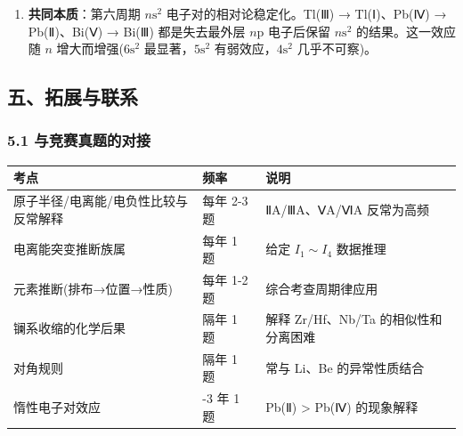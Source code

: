 \begin{enumerate}
\def\labelenumi{(\arabic{enumi})}
\setcounter{enumi}{2}
\tightlist
\item
  \textbf{共同本质}：第六周期 \(n\mathrm{s}^2\) 电子对的相对论稳定化。Tl(Ⅲ) → Tl(Ⅰ)、Pb(Ⅳ) → Pb(Ⅱ)、Bi(Ⅴ) → Bi(Ⅲ) 都是失去最外层 \(n\mathrm{p}\) 电子后保留 \(n\mathrm{s}^2\) 的结果。这一效应随 \(n\) 增大而增强(\(6\mathrm{s}^2\) 最显著，\(5\mathrm{s}^2\) 有弱效应，\(4\mathrm{s}^2\) 几乎不可察)。
\end{enumerate}

\subsection{五、拓展与联系}\label{ux4e94ux62d3ux5c55ux4e0eux8054ux7cfb}

\subsubsection{5.1 与竞赛真题的对接}\label{ux4e0eux7adeux8d5bux771fux9898ux7684ux5bf9ux63a5}

{\def\LTcaptype{none} %
\begin{longtable}[]{@{}
  >{\raggedright\arraybackslash}p{}
  >{\centering\arraybackslash}p{}
  >{\raggedright\arraybackslash}p{}@{}}
\toprule\noalign{}
\begin{minipage}[b]{\linewidth}\raggedright
考点
\end{minipage} & \begin{minipage}[b]{\linewidth}\centering
频率
\end{minipage} & \begin{minipage}[b]{\linewidth}\raggedright
说明
\end{minipage} \\
\midrule\noalign{}
\endhead
\bottomrule\noalign{}
\endlastfoot
原子半径/电离能/电负性比较与反常解释 & 每年 2-3 题 & ⅡA/ⅢA、ⅤA/ⅥA 反常为高频 \\
电离能突变推断族属 & 每年 1 题 & 给定 \(I_1\sim I_4\) 数据推理 \\
元素推断(排布→位置→性质) & 每年 1-2 题 & 综合考查周期律应用 \\
镧系收缩的化学后果 & 隔年 1 题 & 解释 Zr/Hf、Nb/Ta 的相似性和分离困难 \\
对角规则 & 隔年 1 题 & 常与 Li、Be 的异常性质结合 \\
惰性电子对效应 & 2-3 年 1 题 & Pb(Ⅱ) \textgreater{} Pb(Ⅳ) 的现象解释 \\
\end{longtable}
}

